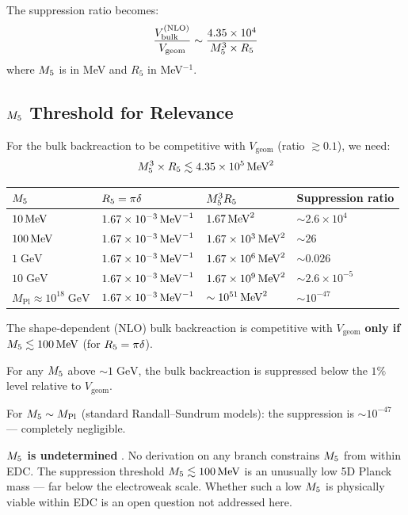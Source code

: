The suppression ratio becomes:
\begin{equation}
    \frac{V_{\mathrm{bulk}}^{(\mathrm{NLO})}}{V_{\mathrm{geom}}}
    \sim \frac{4.35 \times 10^4}{M_5^3 \times R_5}
    \label{eq:N2_suppression_ratio}
\end{equation}
where $M_5$ is in MeV and $R_5$ in MeV$^{-1}$.

\subsection{$M_5$ Threshold for Relevance}

For the bulk backreaction to be competitive with $V_{\mathrm{geom}}$
(ratio $\gtrsim 0.1$), we need:
\begin{equation}
    M_5^3 \times R_5 \lesssim 4.35 \times 10^5\,\mathrm{MeV}^2
    \label{eq:N2_threshold}
\end{equation}

\begin{center}
\begin{tabular}{llll}
\toprule
$M_5$ & $R_5 = \pi\delta$ & $M_5^3 R_5$ & Suppression ratio \\
\midrule
$10\,\mathrm{MeV}$ & $1.67 \times 10^{-3}\,\mathrm{MeV}^{-1}$ & $1.67\,\mathrm{MeV}^2$ & $\sim 2.6 \times 10^4$ \\
$100\,\mathrm{MeV}$ & $1.67 \times 10^{-3}\,\mathrm{MeV}^{-1}$ & $1.67 \times 10^3\,\mathrm{MeV}^2$ & $\sim 26$ \\
$1\;\mathrm{GeV}$ & $1.67 \times 10^{-3}\,\mathrm{MeV}^{-1}$ & $1.67 \times 10^6\,\mathrm{MeV}^2$ & $\sim 0.026$ \\
$10\;\mathrm{GeV}$ & $1.67 \times 10^{-3}\,\mathrm{MeV}^{-1}$ & $1.67 \times 10^9\,\mathrm{MeV}^2$ & $\sim 2.6 \times 10^{-5}$ \\
$M_{\mathrm{Pl}} \approx 10^{18}\;\mathrm{GeV}$ & $1.67 \times 10^{-3}\,\mathrm{MeV}^{-1}$ & $\sim 10^{51}\,\mathrm{MeV}^2$ & $\sim 10^{-47}$ \\
\bottomrule
\end{tabular}
\end{center}

\begin{resultbox}[title=$\kappa_5^2$-Suppression Verdict]
The shape-dependent (NLO) bulk backreaction is competitive with
$V_{\mathrm{geom}}$ \textbf{only if $M_5 \lesssim 100\,\mathrm{MeV}$}
(for $R_5 = \pi\delta$).

For any $M_5$ above $\sim 1\;\mathrm{GeV}$, the bulk backreaction
is suppressed below the $1\%$ level relative to $V_{\mathrm{geom}}$.

For $M_5 \sim M_{\mathrm{Pl}}$ (standard Randall--Sundrum models):
the suppression is $\sim 10^{-47}$ --- completely negligible.

\textbf{$M_5$ is undetermined} \tagP. No derivation on any branch
constrains $M_5$ from within EDC. The suppression threshold
$M_5 \lesssim 100\,\mathrm{MeV}$ is an unusually low 5D Planck mass ---
far below the electroweak scale. Whether such a low $M_5$ is
physically viable within EDC is an open question not addressed here.
\tagOpen
\end{resultbox}

